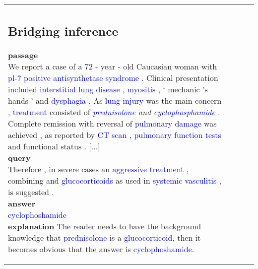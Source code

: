 \documentclass[11pt,a4paper]{article}
\begin{document}
\begin{table}[t]
\begin{tabular}{p{2.7cm} p{1.8cm} l r}
{\subsection{Bridging inference}
\noindent
\textbf{passage}\\
We report a case of a 72 - year - old Caucasian woman with \textcolor{blue}{pl-7 positive antisynthetase syndrome} . Clinical presentation included \textcolor{blue}{interstitial lung disease} , \textcolor{blue}{myositis} , ‘ mechanic 's hands ’ and \textcolor{blue}{dysphagia} . As \textcolor{blue}{lung injury} was the main concern , \textcolor{blue}{treatment} consisted of \textit{\mbox{\textcolor{blue}{prednisolone}} and \mbox{\textcolor{blue}{cyclophosphamide}}} . Complete remission with reversal of \textcolor{blue}{pulmonary damage} was achieved , as reported by \textcolor{blue}{CT scan} , \textcolor{blue}{pulmonary function tests} and functional status . [...]\\
\textbf{query}\\
Therefore , in severe cases an \textcolor{blue}{aggressive treatment} , combining \textcolor{blue}{\textbf{\underline{\hspace{2cm}}}} and \textcolor{blue}{glucocorticoids} as used in \textcolor{blue}{systemic vasculitis} , is suggested .\\
\textbf{answer}\\
\textcolor{blue}{cyclophoshamide}\\
\textbf{explanation} The reader needs to have the background knowledge that \textcolor{blue}{prednisolone} is a \textcolor{blue}{glucocorticoid}, then it becomes obvious that the answer is \textcolor{blue}{cyclophoshamide}.

}
\end{tabular}
\end{table}
\end{document}
